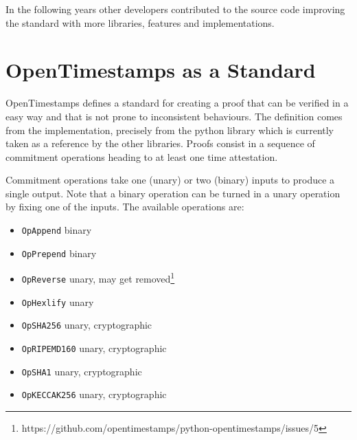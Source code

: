 In the following years other developers contributed to the source code improving the standard with more libraries, features and implementations. 

\section{OpenTimestamps as a Standard}
OpenTimestamps defines a standard for creating a proof that can be verified in a easy way and that is not prone to inconsistent behaviours. The definition comes from the implementation, precisely from the python library which is currently taken as a reference by the other libraries.
Proofs consist in a sequence of commitment operations heading to at least one time attestation. 

Commitment operations take one (unary) or two (binary) inputs to produce a single output. Note that a binary operation can be turned in a unary operation by fixing one of the inputs. The available operations are:
\begin{itemize}
	\item
	\verb|OpAppend| binary
	\item \verb|OpPrepend| binary
	\item \verb|OpReverse| unary, may get removed\footnote{https://github.com/opentimestamps/python-opentimestamps/issues/5}
	\item \verb|OpHexlify| unary
	\item \verb|OpSHA256| unary, cryptographic
	\item \verb|OpRIPEMD160| unary, cryptographic
	\item \verb|OpSHA1| unary, cryptographic
	\item \verb|OpKECCAK256| unary, cryptographic
\end{itemize}

